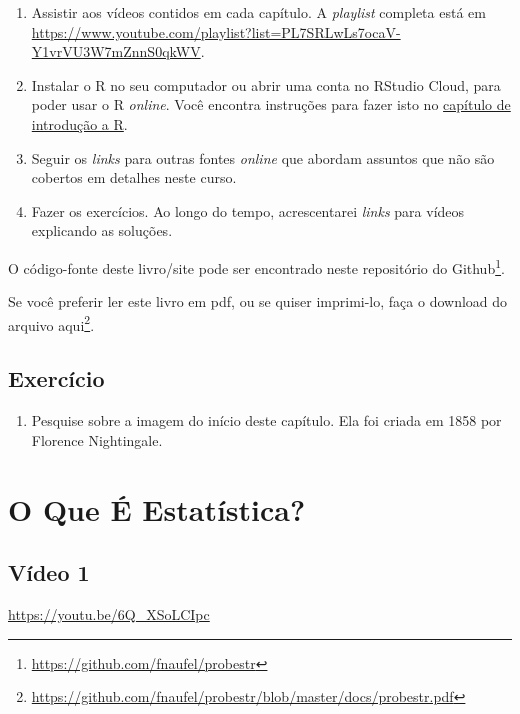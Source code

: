 \documentclass[
  11pt]{report}
\DeclareRobustCommand{\href}[2]{#2\footnote{\url{#1}}}
\providecommand{\tightlist}{%
  \setlength{\itemsep}{0pt}\setlength{\parskip}{0pt}}
\begin{document}
\begin{enumerate}
\def\labelenumi{\arabic{enumi}.}
\item
  Assistir aos vídeos contidos em cada capítulo. A \emph{playlist} completa está em \url{https://www.youtube.com/playlist?list=PL7SRLwLs7ocaV-Y1vrVU3W7mZnnS0qkWV}.
\item
  Instalar o R no seu computador ou abrir uma conta no RStudio Cloud, para poder usar o R \emph{online}. Você encontra instruções para fazer isto no \protect\hyperlink{rintro}{capítulo de introdução a R}.
\item
  Seguir os \emph{links} para outras fontes \emph{online} que abordam assuntos que não são cobertos em detalhes neste curso.
\item
  Fazer os exercícios. Ao longo do tempo, acrescentarei \emph{links} para vídeos explicando as soluções.
\end{enumerate}

O código-fonte deste livro/site pode ser encontrado \href{https://github.com/fnaufel/probestr}{neste repositório do Github}.

Se você preferir ler este livro em pdf, ou se quiser imprimi-lo, \href{https://github.com/fnaufel/probestr/blob/master/docs/probestr.pdf}{faça o download do arquivo aqui}.

\hypertarget{exercuxedcio}{%
\section*{Exercício}\label{exercuxedcio}}

\begin{enumerate}
\def\labelenumi{\arabic{enumi}.}
\tightlist
\item
  Pesquise sobre a imagem do início deste capítulo. Ela foi criada em 1858 por Florence Nightingale.
\end{enumerate}

\hypertarget{oque}{%
\chapter{O Que É Estatística?}\label{oque}}

\hypertarget{vuxeddeo-1}{%
\section{Vídeo 1}\label{vuxeddeo-1}}

\begin{center} \url{https://youtu.be/6Q_XSoLCIpc} \end{center}
\end{document}
